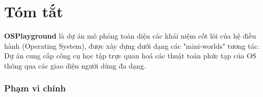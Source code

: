 
{\hypersetup{linkcolor=black}
\setcounter{page}{1}

\tableofcontents
\clearpage

\listoffigures
\clearpage

\listoftables
\clearpage
}

\chapter*{Tóm tắt}

\textbf{OSPlayground} là dự án mô phỏng toàn diện các khái niệm cốt lõi của hệ điều hành (Operating System), 
được xây dựng dưới dạng các "mini-worlds" tương tác. Dự án cung cấp công cụ học tập trực quan hoá 
các thuật toán phức tạp của OS thông qua các giao diện người dùng đa dạng.

\subsection*{Phạm vi chính}

